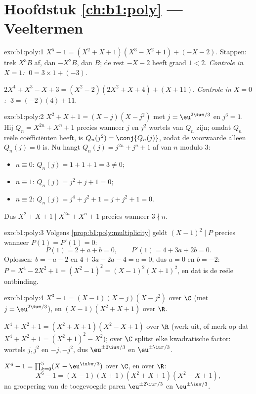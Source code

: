 \section*{Hoofdstuk \ref{ch:b1:poly} --- Veeltermen}

\begin{solution}{exo:b1:poly:1}
$X^5 - 1 = (X^2 + X + 1)(X^3 - X^2 + 1) + (-X - 2)$. Stappen: trek $X^3
B$ af, dan $-X^2 B$, dan $B$; de rest $-X - 2$ heeft graad $1 < 2$.
\emph{Controle in $X = 1$:} $\;0 = 3 \times 1 + (-3)$.

$2X^4 + X^3 - X + 3 = (X^2 - 2)(2X^2 + X + 4) + (X + 11)$.
\emph{Controle in $X = 0$:} $\;3 = (-2)(4) + 11$.
\end{solution}

\begin{solution}{exo:b1:poly:2}
$X^2 + X + 1 = (X - j)(X - j^2)$ met $j = \eu^{2\iu\pi/3}$ en $j^3 = 1$.
Hij  $Q_n = X^{2n} + X^n + 1$ precies wanneer $j$ en $j^2$ wortels
van $Q_n$ zijn; omdat $Q_n$ reële coëfficiënten heeft, is $Q_n(j^2) =
\conj{Q_n(j)}$, zodat de voorwaarde alleen $Q_n(j) = 0$ is. Nu hangt
$Q_n(j) = j^{2n} + j^n + 1$ af van $n$ modulo $3$:
\begin{itemize}
  \item $n \equiv 0$: $Q_n(j) = 1 + 1 + 1 = 3 \neq 0$;
  \item $n \equiv 1$: $Q_n(j) = j^2 + j + 1 = 0$;
  \item $n \equiv 2$: $Q_n(j) = j^4 + j^2 + 1 = j + j^2 + 1 = 0$.
\end{itemize}
Dus $X^2 + X + 1 \mid X^{2n} + X^n + 1$ precies wanneer $3 \nmid n$.
\end{solution}

\begin{solution}{exo:b1:poly:3}
Volgens \cref{prop:b1:poly:multiplicity} geldt $(X-1)^2 \mid P$ precies
wanneer $P(1) = P'(1) = 0$:
\[
P(1) = 2 + a + b = 0, \qquad P'(1) = 4 + 3a + 2b = 0 .
\]
Oplossen: $b = -a - 2$ en $4 + 3a - 2a - 4 = a = 0$, dus $a = 0$ en $b =
-2$: $P = X^4 - 2X^2 + 1 = (X^2 - 1)^2 = (X-1)^2 (X+1)^2$, en dat is de
reële ontbinding.
\end{solution}

\begin{solution}{exo:b1:poly:4}
$X^3 - 1 = (X - 1)(X - j)(X - j^2)$ over $\C$ (met $j =
\eu^{2\iu\pi/3}$), en $(X - 1)(X^2 + X + 1)$ over $\R$.

$X^4 + X^2 + 1 = (X^2 + X + 1)(X^2 - X + 1)$ over $\R$ (werk uit, of merk
op dat $X^4 + X^2 + 1 = (X^2+1)^2 - X^2$); over $\C$ splitst elke
kwadratische factor: wortels $j, j^2$ en $-j, -j^2$, dus $\eu^{\pm
2\iu\pi/3}$ en $\eu^{\pm\iu\pi/3}$.

$X^6 - 1 = \prod_{k=0}^{5} (X - \eu^{\iu k\pi/3})$ over $\C$, en over
$\R$:
\[
X^6 - 1 = (X-1)(X+1)(X^2 + X + 1)(X^2 - X + 1),
\]
na groepering van de toegevoegde paren $\eu^{\pm 2\iu\pi/3}$ en
$\eu^{\pm \iu\pi/3}$.
\end{solution}

